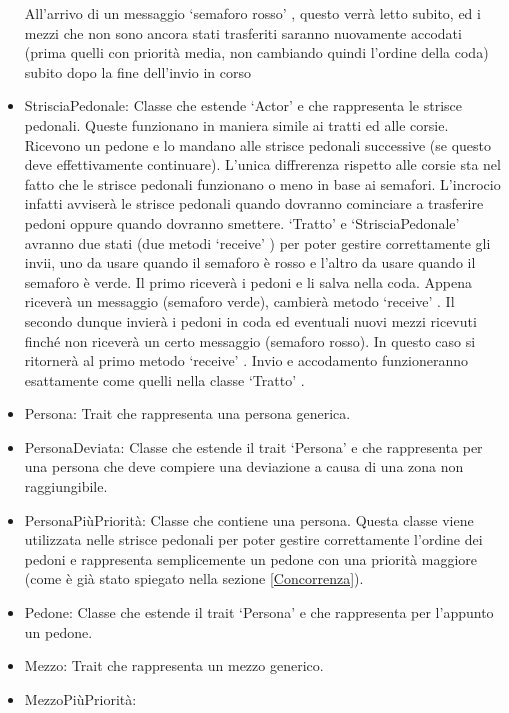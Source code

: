 \documentclass{article}
\begin{document}
\begin{itemize}
All\textquoteright{}arrivo di un messaggio \lq semaforo rosso\rq{} , questo verr\`{a} letto subito, ed i mezzi che non sono ancora stati trasferiti saranno nuovamente accodati (prima quelli con priorit\`{a} media, non cambiando quindi l\textquoteright{}ordine della coda) subito dopo la fine dell\textquoteright{}invio in corso
\item {StrisciaPedonale:}
Classe che estende \lq Actor\rq{} e che rappresenta le strisce pedonali. Queste funzionano in maniera simile ai tratti ed alle corsie. Ricevono un pedone e lo mandano alle strisce pedonali successive (se questo deve effettivamente continuare). L\textquoteright{}unica diffrerenza rispetto alle corsie sta nel fatto che le strisce pedonali funzionano o meno in base ai semafori. L\textquoteright{}incrocio infatti avviser\`{a} le strisce pedonali quando dovranno cominciare a trasferire pedoni oppure quando dovranno smettere.
\lq Tratto\rq{} e \lq StrisciaPedonale\rq{} avranno due stati (due metodi \lq receive\rq{} ) per poter gestire correttamente gli invii, uno da usare quando il semaforo \`{e} rosso e l\textquoteright{}altro da usare quando il semaforo \`{e} verde. Il primo ricever\`{a} i pedoni e li salva nella coda. Appena ricever\`{a} un messaggio (semaforo verde), cambier\`{a} metodo \lq receive\rq{} . Il secondo dunque invier\`{a} i pedoni in coda ed eventuali nuovi mezzi ricevuti finché non ricever\`{a} un certo messaggio (semaforo rosso). In questo caso si ritorner\`{a} al primo metodo \lq receive\rq{} . Invio e accodamento funzioneranno esattamente come quelli nella classe \lq Tratto\rq{} .
\item {Persona:}
Trait che rappresenta una persona generica.
\item {PersonaDeviata:}
Classe che estende il trait \lq Persona\rq{} e che rappresenta per una persona che deve compiere una deviazione a causa di una zona non raggiungibile. 
\item {PersonaPi\`{u}Priorit\`{a}:}
Classe che contiene una persona. Questa classe viene utilizzata nelle strisce pedonali per poter gestire correttamente l'ordine dei pedoni e rappresenta semplicemente un pedone con una priorit\`{a} maggiore (come \`{e} gi\`{a} stato spiegato nella sezione \ref{Concorrenza}).
\item {Pedone:}
Classe che estende il trait \lq Persona\rq{} e che rappresenta per l\textquoteright{}appunto un pedone. 
\item {Mezzo:}
Trait che rappresenta un mezzo generico.
\item {MezzoPi\`{u}Priorit\`{a}:}

\end{itemize}
\end{document}
